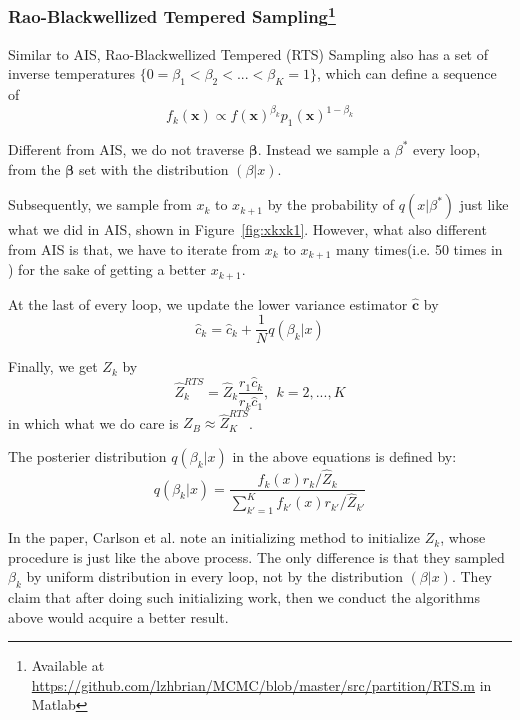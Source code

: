 
\subsubsection{Rao-Blackwellized Tempered Sampling\protect\footnote{Available at \protect\url{https://github.com/lzhbrian/MCMC/blob/master/src/partition/RTS.m} in Matlab}}

Similar to AIS, Rao-Blackwellized Tempered (RTS)\cite{carlson2016partition} Sampling also has a set of inverse temperatures $\{0= \beta_{1} < \beta_{2} < ... < \beta_{K} =1\}$, which can define a sequence of
\begin{equation}
f_{k}(\mathbf x) \propto f(\mathbf x)^{\beta_{k}} p_{1}(\mathbf x)^{1-\beta_{k}}
\end{equation}

Different from AIS, we do not traverse $\mathbf \beta$. Instead we sample a $\beta^{*}$ every loop, from the $\mathbf \beta$ set with the distribution $(\beta|x)$.

Subsequently, we sample from $x_{k}$ to $x_{k+1}$ by the probability of $q(x|\beta^{*})$ just like what we did in AIS, shown in Figure~\ref{fig:xkxk1}. However, what also different from AIS is that, we have to iterate from $x_{k}$ to $x_{k+1}$ many times(i.e. 50 times in\cite{carlson2016partition} ) for the sake of getting a better $x_{k+1}$.

At the last of every loop, we update the lower variance estimator $\hat{\mathbf c}$ by
\begin{equation}
\hat{c}_{k} = \hat{c}_{k} + \frac{1}{N}q(\beta_{k}|x)
\end{equation}

Finally, we get $Z_{k}$ by
\begin{equation}
\hat{Z}_{k}^{RTS} = \hat{Z}_{k}\frac{r_{1}\hat{c}_{k}}{r_{k}\hat{c}_{1}},~~k=2,...,K
\end{equation}
in which what we do care is $Z_{B} \approx \hat{Z}_{K}^{RTS}$.

The posterier distribution $q(\beta_{k}|x)$ in the above equations is defined by:
\begin{equation}
q(\beta_{k}|x) = \frac{f_{k}(x)r_{k}/\hat{Z}_{k}}{\sum_{k'=1}^{K} f_{k'}(x)r_{k'}/\hat{Z}_{k'}}
\end{equation}

In the paper\cite{carlson2016partition}, Carlson et al. note an initializing method to initialize $Z_{k}$, whose procedure is just like the above process. The only difference is that they sampled $\beta_{k}$ by uniform distribution in every loop, not by the distribution $(\beta|x)$. They claim that after doing such initializing work, then we conduct the algorithms above would acquire a better result.

